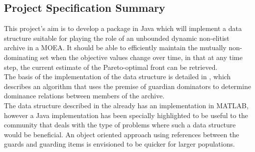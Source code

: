 \documentclass{ecmm427_assignment}
\begin{document}
\subsection{Project Specification Summary}
This project's aim is to develop a package in Java which will implement a data structure suitable for playing the role of an unbounded dynamic non-elitist archive in a MOEA. It should be able to efficiently maintain the mutually non-dominating set when the objective values change over time, in that at any time step, the current estimate of the Pareto-optimal front can be retrieved.\\
The basis of the implementation of the data structure is detailed in \cite{Fieldsend2014}, which describes an algorithm that uses the premise of guardian dominators to determine dominance relations between members of the archive.\\
The data structure described in the \cite{Fieldsend2014} already has an implementation in MATLAB, however a Java implementation has been specially highlighted to be useful to the community that deals with the type of problems where such a data structure would be beneficial. An object oriented approach using references between the guards and guarding items is envisioned to be quicker for larger populations.
\end{document}
